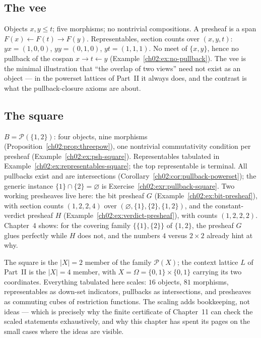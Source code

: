 \subsection{The vee}\label{ch02:sec:lab-vee}

Objects $x, y \le t$; five morphisms; no nontrivial compositions. A
presheaf is a span $F(x) \leftarrow F(t) \to F(y)$. Representables,
section counts over $(x, y, t)$: $yx = (1, 0, 0)$, $yy = (0, 1, 0)$,
$yt = (1, 1, 1)$. No meet of $\{x, y\}$, hence no pullback of the
cospan $x \to t \leftarrow y$
(Example~\ref{ch02:ex:no-pullback}). The vee is the minimal
illustration that ``the overlap of two views'' need not exist as an
object --- in the powerset lattices of Part~II it always does, and the
contrast is what the pullback-closure axioms are about.

\subsection{The square}\label{ch02:sec:lab-square}

$B = \mathcal{P}(\{1,2\})$: four objects, nine morphisms
(Proposition~\ref{ch02:prop:threepow}), one nontrivial commutativity
condition per presheaf (Example~\ref{ch02:ex:psh-square}).
Representables tabulated in
Example~\ref{ch02:ex:representables-square}; the top representable is
terminal. All pullbacks exist and are intersections
(Corollary~\ref{ch02:cor:pullback-powerset}); the generic instance
$\{1\} \cap \{2\} = \varnothing$ is
Exercise~\ref{ch02:exr:pullback-square}. Two working presheaves live
here: the bit presheaf $G$ (Example~\ref{ch02:ex:bit-presheaf}), with
section counts $(1, 2, 2, 4)$ over
$(\varnothing, \{1\}, \{2\}, \{1,2\})$, and the constant-verdict
presheaf $H$ (Example~\ref{ch02:ex:verdict-presheaf}), with counts
$(1, 2, 2, 2)$. Chapter~4 shows: for the covering family
$\{ \{1\}, \{2\} \}$ of $\{1,2\}$, the presheaf $G$ glues perfectly
while $H$ does not, and the numbers $4$ versus $2 \times 2$ already
hint at why.

The square is the $|X| = 2$ member of the family
$\mathcal{P}(X)$; the context lattice $L$ of Part~II is the
$|X| = 4$ member, with $X = \Omega = \{0,1\} \times \{0,1\}$ carrying
its two coordinates. Everything tabulated here scales: $16$ objects,
$81$ morphisms, representables as down-set indicators, pullbacks as
intersections, and presheaves as commuting cubes of restriction
functions. The scaling adds bookkeeping, not ideas --- which is
precisely why the finite certificate of Chapter~11 can check the
scaled statements exhaustively, and why this chapter has spent its
pages on the small cases where the ideas are visible.

